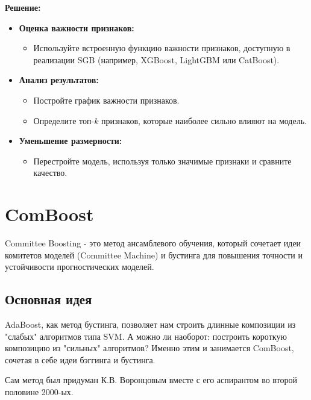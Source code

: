 \textbf{Решение:}

\begin{itemize}
    \item \textbf{Оценка важности признаков:}
          \begin{itemize}
              \item Используйте встроенную функцию важности признаков, доступную в реализации SGB (например, XGBoost, LightGBM или CatBoost).
          \end{itemize}
    \item \textbf{Анализ результатов:}
          \begin{itemize}
              \item Постройте график важности признаков.
              \item Определите топ-$k$ признаков, которые наиболее сильно влияют на модель.
          \end{itemize}
    \item \textbf{Уменьшение размерности:}
          \begin{itemize}
              \item Перестройте модель, используя только значимые признаки и сравните качество.
          \end{itemize}
\end{itemize}


\section{ComBoost}

Committee Boosting -  это метод ансамблевого обучения, который сочетает идеи комитетов моделей (Committee Machine) и бустинга для повышения точности и устойчивости прогностических моделей.

\subsection{Основная идея}

AdaBoost, как метод бустинга, позволяет нам строить длинные композиции из "слабых" алгоритмов типа SVM. А можно ли наоборот: построить короткую композицию из "сильных" алгоритмов? Именно этим и занимается ComBoost, сочетая в себе идеи бэггинга и бустинга.

Сам метод был придуман К.В. Воронцовым вместе с его аспирантом во второй половине 2000-ых.

